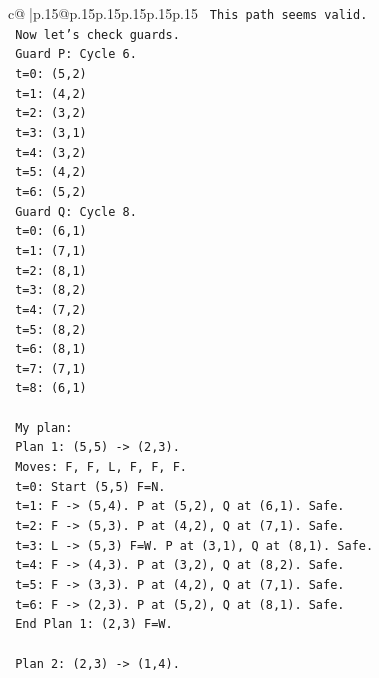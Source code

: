 \documentclass{article}
\begin{document}
{\begin{supertabular}{c@{$\;$}|p{.15\linewidth}@{}p{.15\linewidth}p{.15\linewidth}p{.15\linewidth}p{.15\linewidth}p{.15\linewidth}}
{{{\texttt{     This path seems valid.} \\
\texttt{     Now let's check guards.} \\
\texttt{     Guard P: Cycle 6.} \\
\texttt{     t=0: (5,2)} \\
\texttt{     t=1: (4,2)} \\
\texttt{     t=2: (3,2)} \\
\texttt{     t=3: (3,1)} \\
\texttt{     t=4: (3,2)} \\
\texttt{     t=5: (4,2)} \\
\texttt{     t=6: (5,2)} \\
\texttt{     Guard Q: Cycle 8.} \\
\texttt{     t=0: (6,1)} \\
\texttt{     t=1: (7,1)} \\
\texttt{     t=2: (8,1)} \\
\texttt{     t=3: (8,2)} \\
\texttt{     t=4: (7,2)} \\
\texttt{     t=5: (8,2)} \\
\texttt{     t=6: (8,1)} \\
\texttt{     t=7: (7,1)} \\
\texttt{     t=8: (6,1)} \\
\\ 
\texttt{     My plan:} \\
\texttt{     Plan 1: (5,5) {-}> (2,3).} \\
\texttt{     Moves: F, F, L, F, F, F.} \\
\texttt{     t=0: Start (5,5) F=N.} \\
\texttt{     t=1: F {-}> (5,4). P at (5,2), Q at (6,1). Safe.} \\
\texttt{     t=2: F {-}> (5,3). P at (4,2), Q at (7,1). Safe.} \\
\texttt{     t=3: L {-}> (5,3) F=W. P at (3,1), Q at (8,1). Safe.} \\
\texttt{     t=4: F {-}> (4,3). P at (3,2), Q at (8,2). Safe.} \\
\texttt{     t=5: F {-}> (3,3). P at (4,2), Q at (7,1). Safe.} \\
\texttt{     t=6: F {-}> (2,3). P at (5,2), Q at (8,1). Safe.} \\
\texttt{     End Plan 1: (2,3) F=W.} \\
\\ 
\texttt{     Plan 2: (2,3) {-}> (1,4).} \\
}}}
\end{supertabular}}
\end{document}
